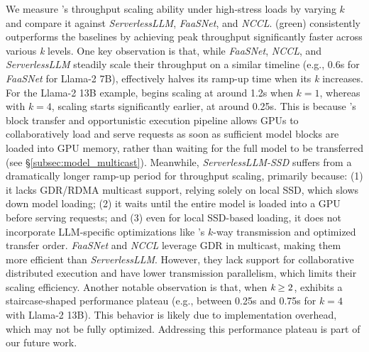 { 
We measure \SysName's throughput scaling ability under high-stress loads by varying $k$ and compare it against \textit{ServerlessLLM}, \textit{FaaSNet}, and \textit{NCCL}.  
\SysName (green) consistently outperforms the baselines by achieving peak throughput significantly faster across various \emph{k} levels. 
One key observation is that, while \textit{FaaSNet}, \textit{NCCL}, and \textit{ServerlessLLM} steadily scale their throughput on a similar timeline (e.g., 0.6s for \textit{FaaSNet} for Llama-2 7B), 
\SysName effectively halves its ramp-up time when its \emph{k} increases. For the Llama-2 13B example, \SysName begins scaling at around 1.2s when $k=1$, whereas with $k=4$, scaling starts significantly earlier, at around 0.25s. 
This is because \AlgoName's block transfer and opportunistic execution pipeline allows GPUs to collaboratively load and serve requests as soon as sufficient model blocks are loaded into GPU memory, rather than waiting for the full model to be transferred (see \S\ref{subsec:model_multicast}). 
Meanwhile, \textit{ServerlessLLM-SSD} suffers from a dramatically longer ramp-up period for throughput scaling, primarily because: 
(1) it lacks GDR/RDMA multicast support, relying solely on local SSD, which slows down model loading; 
(2) it waits until the entire model is loaded into a GPU before serving requests; 
and (3) even for local SSD-based loading, it does not incorporate LLM-specific optimizations like \SysName's $k$-way transmission and optimized transfer order. 
\textit{FaaSNet} and \textit{NCCL} leverage GDR in multicast, making them more efficient than \textit{ServerlessLLM}. However, they lack support for collaborative distributed execution and have lower transmission parallelism, which limits their scaling efficiency. 
Another notable observation is that, when $\emph{k}\geq2$, \SysName exhibits a staircase-shaped performance plateau (e.g., between 0.25s and 0.75s for $k=4$ with Llama-2 13B). This behavior is likely due to implementation overhead, which may not be fully optimized. Addressing this performance plateau is part of our future work. 


}

